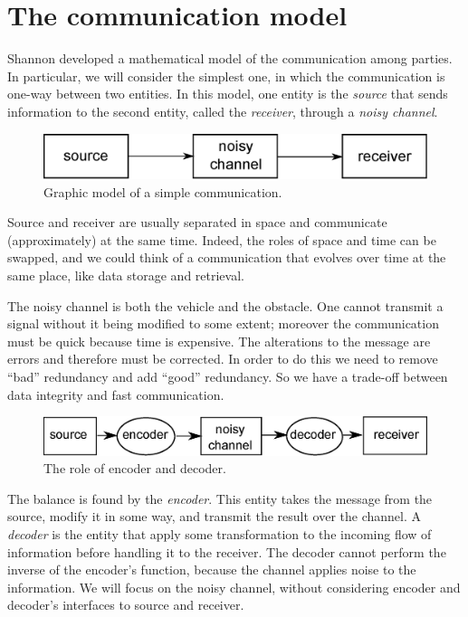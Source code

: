
\chapter{The communication model}

Shannon developed a mathematical model of the communication among parties.
In particular, we will consider the simplest one, in which the communication is one-way between two entities.
In this model, one entity is the \emph{source} that sends information to the second entity, called the \emph{receiver}, through a \emph{noisy channel}.

\begin{figure}
	\centering
	\includegraphics[width=0.8\linewidth]{pictures/comm-channel.eps}
	\caption{Graphic model of a simple communication.}
\end{figure}

Source and receiver are usually separated in space and communicate (approximately) at the same time.
Indeed, the roles of space and time can be swapped, and we could think of a communication that evolves over time at the same place, like data storage and retrieval.

The noisy channel is both the vehicle and the obstacle.
One cannot transmit a signal without it being modified to some extent; moreover the communication must be quick because time is expensive.
The alterations to the message are errors and therefore must be corrected.
In order to do this we need to remove ``bad'' redundancy and add ``good'' redundancy.
So we have a trade-off between data integrity and fast communication.

\begin{figure}
	\centering
	\includegraphics[width=0.8\linewidth]{pictures/comm-channel1.eps}
	\caption{The role of encoder and decoder.}
\end{figure}

The balance is found by the \emph{encoder}.
This entity takes the message from the source, modify it in some way, and transmit the result over the channel.
A \emph{decoder} is the entity that apply some transformation to the incoming flow of information before handling it to the receiver.
The decoder cannot perform the inverse of the encoder's function, because the channel applies noise to the information.
We will focus on the noisy channel, without considering encoder and decoder's interfaces to source and receiver.

